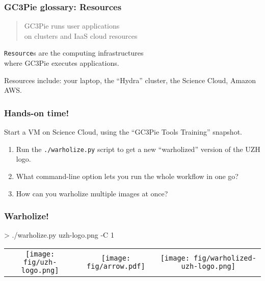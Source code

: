 \documentclass[english,serif,mathserif,usenames,dvipsnames]{beamer}
\begin{document}
\begin{frame}
  \frametitle{GC3Pie glossary: Resources}
  \begin{quote}
    GC3Pie runs user applications
    \\
    on clusters and IaaS cloud \alert{resources}
  \end{quote}

  \+ \alert{\texttt{Resource}s are the computing infrastructures \\ where GC3Pie executes applications.}

  \+ Resources include: your laptop, the ``Hydra'' cluster, the Science Cloud, Amazon AWS.
\end{frame}


\begin{frame}
  \frametitle{Hands-on time!}

  Start a VM on Science Cloud, using the ``GC3Pie Tools Training'' snapshot.

  \+
  \begin{exercise}

    \begin{enumerate}
    \item Run the \texttt{./warholize.py} script to get a new
      ``warholized'' version of the UZH logo.

    \item What command-line option lets you run the whole workflow
      in one go?

    \item How can you warholize \textrm{multiple} images at once?
    \end{enumerate}
  \end{exercise}
\end{frame}


\begin{frame}
  \frametitle{Warholize!}

\begin{semiverbatim}
    > ./warholize.py uzh-logo.png -C 1
\end{semiverbatim}

  \begin{tabular}[c]{ccc}
    \texttt{[image: fig/uzh-logo.png]}
    &
    \texttt{[image: fig/arrow.pdf]}
    &
    \texttt{[image: fig/warholized-uzh-logo.png]}
  \end{tabular}
\end{frame}
\end{document}
